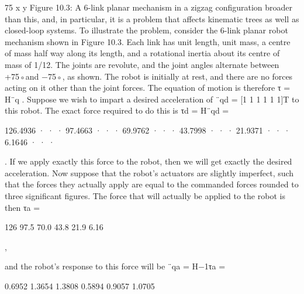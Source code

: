 75 x y Figure 10.3: A 6-link planar mechanism in a zigzag configuration broader than this, and, in particular, it is a problem that affects kinematic trees as well as closed-loop systems. To illustrate the problem, consider the 6-link planar robot mechanism shown in Figure 10.3. Each link has unit length, unit mass, a centre of mass half way along its length, and a rotational inertia about its centre of mass of 1/12. The joints are revolute, and the joint angles alternate between +75◦and −75◦, as shown. The robot is initially at rest, and there are no forces acting on it other than the joint forces. The equation of motion is therefore τ = H¨q . Suppose we wish to impart a desired acceleration of ¨qd = [1 1 1 1 1 1]T to this robot. The exact force required to do this is τd = H¨qd =

126.4936 · · · 97.4663 · · · 69.9762 · · · 43.7998 · · · 21.9371 · · · 6.1646 · · ·

. If we apply exactly this force to the robot, then we will get exactly the desired acceleration. Now suppose that the robot’s actuators are slightly imperfect, such that the forces they actually apply are equal to the commanded forces rounded to three significant figures. The force that will actually be applied to the robot is then τa =

126 97.5 70.0 43.8 21.9 6.16

,

and the robot’s response to this force will be ¨qa = H−1τa =

0.6952 1.3654 1.3808 0.5894 0.9057 1.0705

